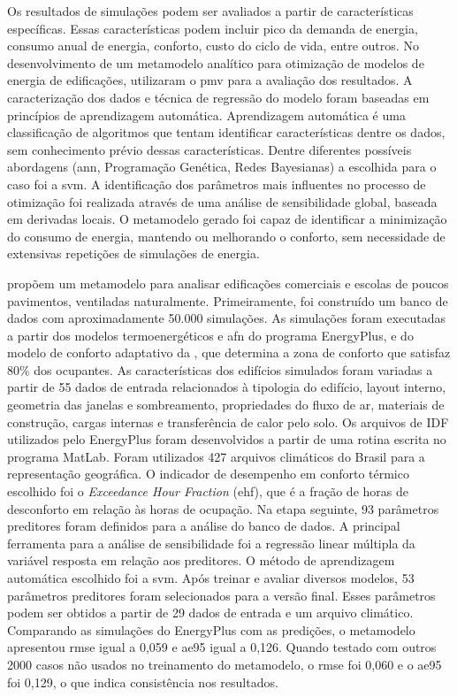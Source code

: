 \documentclass[brazil,hardcopy,openany]{ufscthesis} %
\begin{document}
Os resultados de simulações podem ser avaliados a partir de características específicas. Essas características podem incluir pico da demanda de energia, consumo anual de energia, conforto, custo do ciclo de vida, entre outros. No desenvolvimento de um metamodelo analítico para otimização de modelos de energia de edificações,  utilizaram o \acrshort{pmv} para a avaliação dos resultados. A caracterização dos dados e técnica de regressão do modelo foram baseadas em princípios de aprendizagem automática. Aprendizagem automática é uma classificação de algoritmos que tentam identificar características dentre os dados, sem conhecimento prévio dessas características. 
Dentre diferentes possíveis abordagens (\acrshort{ann}, Programação Genética, Redes Bayesianas) a escolhida para o caso foi a \acrshort{svm}. 
A identificação dos parâmetros mais influentes no processo de otimização foi realizada através de uma análise de sensibilidade global, baseada em derivadas locais. O metamodelo gerado foi capaz de identificar a minimização do consumo de energia, mantendo ou melhorando o conforto, sem necessidade de extensivas repetições de simulações de energia.

 propõem um metamodelo para analisar edificações comerciais e escolas de poucos pavimentos, ventiladas naturalmente. Primeiramente, foi construído um banco de dados com aproximadamente 50.000 simulações. As simulações foram executadas a partir dos modelos termoenergéticos e \acrshort{afn} do programa EnergyPlus, e do modelo de conforto adaptativo da  , que determina a zona de conforto que satisfaz 80\% dos ocupantes. As características dos edifícios simulados foram variadas a partir de 55 dados de entrada relacionados à tipologia do edifício, layout interno, geometria das janelas e sombreamento, propriedades do fluxo de ar, materiais de construção, cargas internas e transferência de calor pelo solo. Os arquivos de IDF utilizados pelo EnergyPlus foram desenvolvidos a partir de uma rotina escrita no programa MatLab. Foram utilizados 427 arquivos climáticos do Brasil para a representação geográfica. 
O indicador de desempenho em conforto térmico escolhido foi o \textit{Exceedance Hour Fraction} (\acrshort{ehf}), que é a fração de horas de desconforto em relação às horas de ocupação. Na etapa seguinte, 93 parâmetros preditores foram definidos para a análise do banco de dados. A principal ferramenta para a análise de sensibilidade foi a regressão linear múltipla da variável resposta em relação aos preditores. O método de aprendizagem automática escolhido foi a \acrshort{svm}. Após treinar e avaliar diversos modelos, 53 parâmetros preditores foram selecionados para a versão final. Esses parâmetros podem ser obtidos a partir de 29 dados de entrada e um arquivo climático. Comparando as simulações do EnergyPlus com as predições, o metamodelo apresentou \acrfull{rmse} igual a 0,059 e \acrfull{ae95} igual a 0,126. Quando testado com outros 2000 casos não usados no treinamento do metamodelo, o \acrshort{rmse} foi 0,060 e o \acrshort{ae95} foi 0,129, o que indica consistência nos resultados. 
\end{document}
